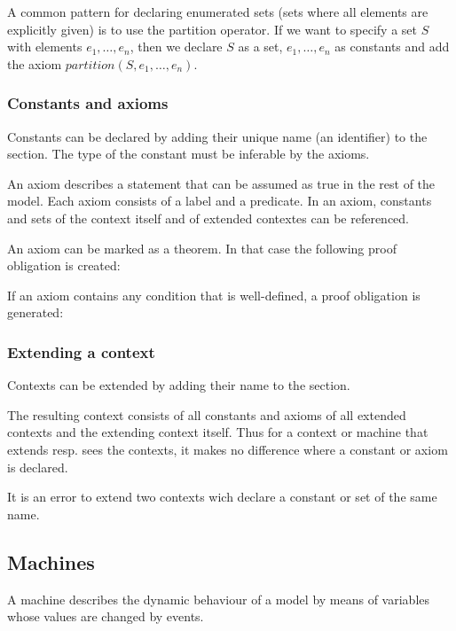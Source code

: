 A common pattern for declaring enumerated sets (sets where all elements are explicitly given)
is to use the partition operator. If we want to specify a set $S$ with elements $e_1,\ldots,e_n$, then
we declare $S$ as a set, $e_1,\ldots,e_n$ as constants and add the axiom $partition(S,e_1,\ldots,e_n)$.

\subsubsection{Constants and axioms}
\label{constants_and_axioms}
Constants can be declared by adding their unique name (an identifier) to the  section.
The type of the constant must be inferable by the axioms.

An axiom describes a statement that can be assumed as true in the rest of the model.
Each axiom consists of a label and a predicate.
In an axiom, constants and sets of the context itself and of extended contextes can be referenced.

An axiom can be marked as a theorem. In that case the following proof obligation is created:

If an axiom contains any condition that is well-defined, a proof obligation is generated:
   
\subsubsection{Extending a context}
Contexts can be extended by adding their name to the  section.

The resulting context consists of all constants and axioms of all extended contexts and the extending context itself.
Thus for a context or machine that extends resp. sees the contexts, it makes no difference where a constant or axiom is declared.

It is an error to extend two contexts wich declare a constant or set of the same name.

\subsection{Machines}
A machine describes the dynamic behaviour of a model by means of variables whose values are changed by events.

